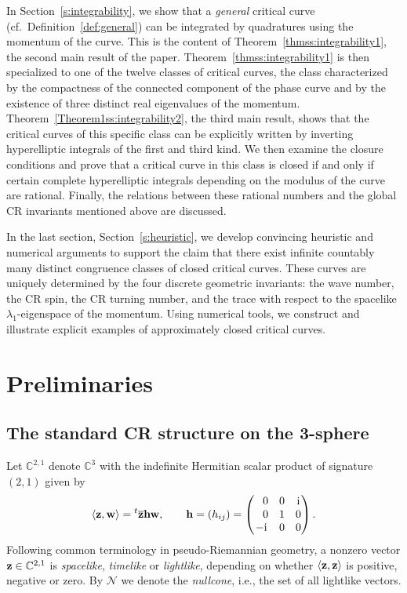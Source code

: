 \documentclass[pdftex]{sigma}
\numberwithin{equation}{section}
\def\C{\mathbb{C}}
\begin{document}
In Section~\ref{s:integrability},
we show that a \textit{general} critical curve (cf.\ Definition~\ref{def:general})
can be integrated by quadratures using the momentum of the curve. This is the content
of Theorem~\ref{thmss:integrability1}, the second main result of the paper.
%
Theorem~\ref{thmss:integrability1} is then specialized
to one of the twelve classes of critical curves, the class characterized by the compactness of the
connected component of the phase
curve and by the existence of three distinct real
{eigenvalues} of the momentum.
Theorem~\ref{Theorem1ss:integrability2}, the third main result,
shows that the critical curves of this specific class can be explicitly written by inverting hyperelliptic integrals
of the first and third kind.
%
We then examine the closure conditions and prove that a critical curve in this class is closed if and only if certain
complete hyperelliptic integrals depending on the {modulus} of the curve are rational.
Finally, the relations between these rational numbers and the global CR invariants mentioned above
are discussed.


In the last section, Section~\ref{s:heuristic}, we develop
convincing heuristic and numerical arguments to support the claim that there exist
infinite countably many distinct congruence classes of closed critical curves.
%
These curves are uniquely determined by the four discrete geometric invariants: the wave number,
the CR spin, the CR turning number, and the trace
with respect to the spacelike $\lambda_1$-eigenspace of the momentum.
Using numerical tools, we construct and illustrate explicit examples of approximately closed critical curves.


\section{Preliminaries}\label{s:preliminaries}

\subsection{The standard CR structure on the 3-sphere}%

Let $\C^{2,1}$ denote $\C^3$ with the indefinite Hermitian scalar product of signature $(2,1)$ given by
\begin{equation}\label{hp}
\langle \mathbf{z},\mathbf{w} \rangle
= {^t \overline{\mathbf{z}}} \mathbf{h} \mathbf{w},
\qquad {\mathbf h}= (h_{ij})=
\begin{pmatrix}
\hphantom{-}0& 0& {\rm i}\\
\hphantom{-}0& 1&0\\
-{\rm i}&0&0
\end{pmatrix}.
 \end{equation}
%
Following common terminology in pseudo-Riemannian geometry, a nonzero vector ${\bf z}\in\C^{2,1}$
is \emph{spacelike}, \emph{timelike} or \emph{lightlike}, depending on whether $\langle {\bf z}, {\bf z}\rangle$
is positive, negative or zero.
By $\mathcal{N}$ we denote the \textit{nullcone}, i.e., the set of all lightlike vectors.
\end{document}
